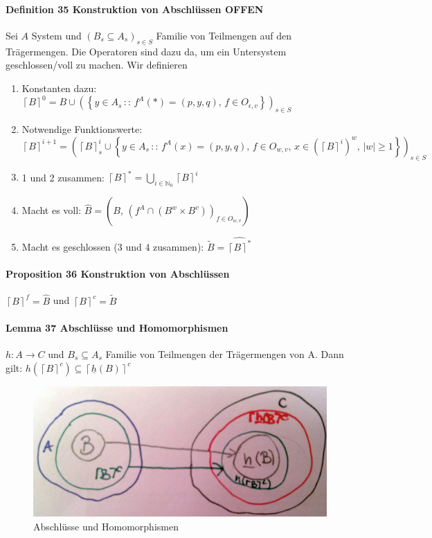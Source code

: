 \paragraph{Definition 35 Konstruktion von Abschlüssen OFFEN}
Sei $A$
System und $\left(B_{s}\subseteq A_{s}\right)_{s\in S}$ Familie von Teilmengen auf den Trägermengen. 
Die Operatoren sind dazu da, um ein Untersystem geschlossen/voll zu machen.
Wir definieren
\begin{enumerate}
\item Konstanten dazu: $\left\lceil B\right\rceil ^{0}=B\cup\left(\left\{ y\in A_{s}\,::\, f^{A}(*)=(p,y,q),\, f\in O_{\epsilon,v}\right\} \right)_{s\in S}$
\item Notwendige Funktionswerte: \\ $\left\lceil B\right\rceil ^{i+1} =\left(\left\lceil B\right\rceil _{s}^{i}\cup\left\{ y\in A_{s}\,::\, f^{A}(x)=(p,y,q),\, f\in O_{w,v},\, x\in\left(\left\lceil B\right\rceil ^{i}\right)^{w},\,|w|\geq1\right\} \right)_{s\in S}$
\item 1 und 2 zusammen: $\left\lceil B\right\rceil ^{*}=\bigcup_{i\in\mathbb{N}_{0}}\left\lceil B\right\rceil ^{i}$
\item Macht es voll:  $\widehat{B}=\left(B,\,\left(f^{A}\cap\left(B^{w}\times B^{v}\right)\right)_{f\in O_{w,v}}\right)$
\item Macht es geschlossen (3 und 4 zusammen):  $\widetilde{B}=\widehat{\left\lceil B\right\rceil ^{*}}$
\end{enumerate}

\paragraph{Proposition 36 Konstruktion von Abschlüssen}

$\left\lceil B\right\rceil ^{f}=\widehat{B}$
und \textup{$\left\lceil B\right\rceil ^{c}=\widetilde{B}$}
\newpage

\paragraph{Lemma 37 Abschlüsse und Homomorphismen}
$h: A \rightarrow C$ und $B_s \subseteq A_s$ Familie von Teilmengen der Trägermengen von A. Dann gilt: $h(\left \lceil B \right \rceil^c) \subseteq \left \lceil \underline{h}(B) \right \rceil^c$

\begin{figure}[h]
\noindent \centering{}\includegraphics[scale=0.08]{Abbildungen/37}\caption{Abschlüsse und Homomorphismen}
\end{figure}

